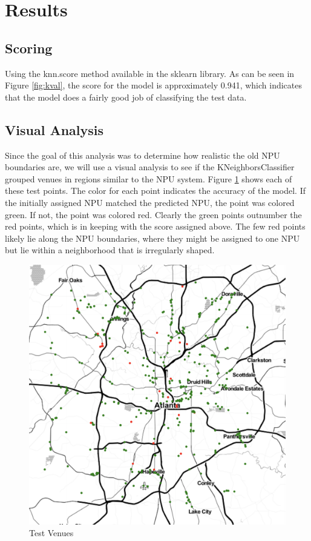 \documentclass[11pt]{amsart}
\begin{document}
\FloatBarrier
\section{Results}
\subsection{Scoring}
Using the knn.score method available in the sklearn library. As can be seen in Figure \ref{fig:kval}, the score for the model is approximately 0.941, which indicates that the model does a fairly good job of classifying the test data. 
\subsection{Visual Analysis}
Since the goal of this analysis was to determine how realistic the old NPU boundaries are, we will use a visual analysis to see if the KNeighborsClassifier grouped venues in regions similar to the NPU system. Figure \ref{fig:preds} shows each of these test points. The color for each point indicates the accuracy of the model. If the initially assigned NPU matched the predicted NPU, the point was colored green. If not, the point was colored red. Clearly the green points outnumber the red points, which is in keeping with the score assigned above. 
The few red points likely lie along the NPU boundaries, where they might be assigned to one NPU but lie within a neighborhood that is irregularly shaped. 

\begin{figure}[h]
\includegraphics[width=\textwidth]{predictions}
\caption{Test Venues}
\label{fig:preds}
\end{figure}
\FloatBarrier
\end{document}

